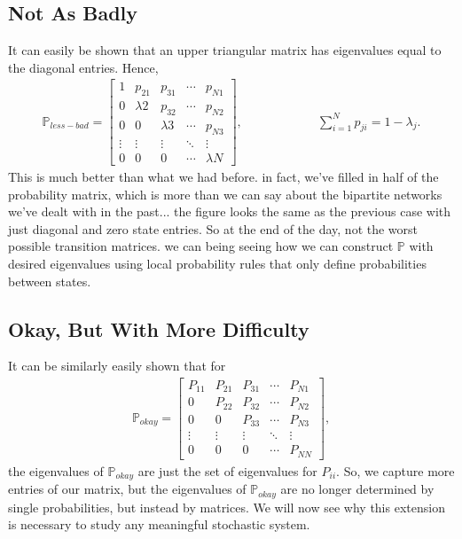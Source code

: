\documentclass[superscriptaddress]{revtex4-1}
\newcommand{\prob}{\mathbb{P}}
\begin{document}
\subsection{Not As Badly}
It can easily be shown that an upper triangular matrix has eigenvalues equal to the diagonal entries. Hence,
\begin{align*}
\prob_{less-bad} = 
\begin{bmatrix}
1      & p_{21}     & p_{31}     & \dotsm & p_{N1}\\
0      & \lambda{2} & p_{32}     & \dotsm & p_{N2}\\
0      & 0          & \lambda{3} & \dotsm & p_{N3}\\
\vdots & \vdots     & \vdots     & \ddots & \vdots\\
0      & 0          & 0          & \dotsm & \lambda{N}
\end{bmatrix},
\hspace{1in}
\sum_{i=1}^N p_{ji} = 1-\lambda_j.
\end{align*}
This is much better than what we had before. in fact, we've filled in half of the probability matrix, which is more than we can say about the bipartite networks we've dealt with in the past... the figure looks the same as the previous case with just diagonal and zero state entries. So at the end of the day, not the worst possible transition matrices. we can being seeing how we can construct $\prob$ with desired eigenvalues using local probability rules that only define probabilities between states. 





\subsection{Okay, But With More Difficulty}
It can be similarly easily shown that for
\begin{align*}
\prob_{okay} =
\begin{bmatrix}
P_{11} & P_{21} & P_{31} & \dotsm & P_{N1}\\
0      & P_{22} & P_{32} & \dotsm & P_{N2}\\
0      & 0      & P_{33} & \dotsm & P_{N3}\\
\vdots & \vdots & \vdots & \ddots & \vdots\\
0      & 0      & 0      & \dotsm & P_{NN}
\end{bmatrix},
\end{align*}
the eigenvalues of $\prob_{okay}$ are just the set of eigenvalues for $P_{ii}$. So, we capture more entries of our matrix, but the eigenvalues of $\prob_{okay}$ are no longer determined by single probabilities, but instead by matrices. We will now see why this extension is necessary to study any meaningful stochastic system.
\newpage~\newpage
\end{document}
